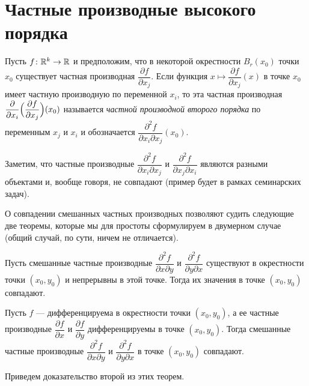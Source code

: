 \documentclass[a4paper]{article}
\theoremstyle{named}
\begin{document}
    \section{Частные производные высокого порядка}

    \begin{definition*}
        Пусть $f\colon \mathbb{R}^k\to \mathbb{R}$ и предположим, что в некоторой окрестности $B_r(x_0)$ точки $x_0$ существует частная производная $\dfrac{\partial f}{\partial x_j}$. Если функция $x\mapsto \dfrac{\partial f}{\partial x_j}(x)$ в точке $x_0$ имеет частную производную по переменной $x_i$, то эта частная производная $\dfrac{\partial}{\partial x_i}\Bigl(\dfrac{\partial f}{\partial x_j}\Bigr) (x_0)$ называется {\it частной производной второго порядка} по переменным $x_j$ и $x_i$
        и обозначается $\dfrac{\partial^2 f}{\partial x_i\partial x_j}(x_0)$.
    \end{definition*}

    \begin{remark*}
        Заметим, что частные производные $\dfrac{\partial^2 f}{\partial x_i\partial x_j}$ и $\dfrac{\partial^2 f}{\partial x_j\partial x_i}$ являются разными объектами и, вообще говоря, не совпадают (пример будет в рамках семинарских задач).
    \end{remark*}

    О совпадении смешанных частных производных позволяют судить следующие две теоремы, которые мы для простоты сформулируем в двумерном случае (общий случай, по сути, ничем не отличается).

    \begin{theorem}[Шварц]
        Пусть смешанные частные производные $\dfrac{\partial^2f}{\partial x\partial y}$ и $\dfrac{\partial^2f}{\partial y\partial x}$ существуют в окрестности точки $(x_0,y_0)$ и непрерывны в этой точке. Тогда их значения в точке $(x_0,y_0)$ совпадают.
    \end{theorem}

    \begin{theorem}[Юнг] Пусть $f$ --- дифференцируема в окрестности точки $(x_0,y_0)$,
    а ее частные производные $\dfrac{\partial f}{\partial x}$ и $\dfrac{\partial f}{\partial y}$
    дифференцируемы в точке $(x_0,y_0)$.
    Тогда смешанные частные производные $\dfrac{\partial^2f}{\partial x\partial y}$
    и $\dfrac{\partial^2f}{\partial y\partial x}$
    в точке $(x_0,y_0)$ совпадают.
    \end{theorem}

    Приведем доказательство второй из этих теорем.
\end{document}
